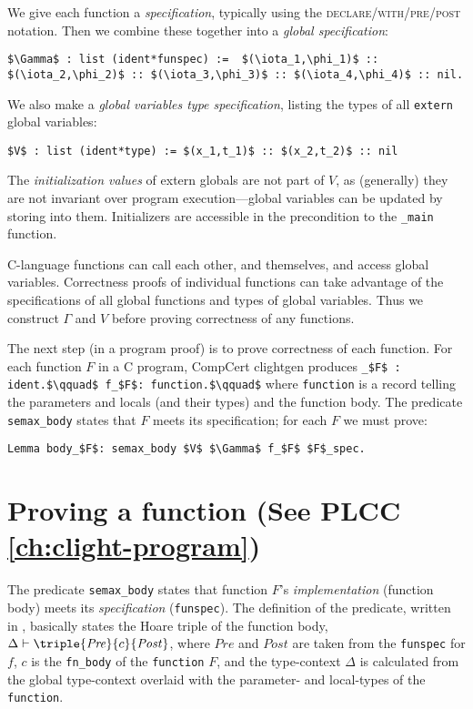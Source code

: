 \documentclass[12pt,fleqn,openany,oneside,showtrims]{memoir}
\newcommand{\ychapter}[2]{\chapter[#1]{#1 \hfill \normalsize #2}}
\begin{document}
We give each function a \emph{specification},
typically using the \textsc{declare/\linebreak[1]with/\linebreak[1]pre/\linebreak[1]post} notation.
Then we combine these together into a \emph{global specification}:
\begin{lstlisting}
$\Gamma$ : list (ident*funspec) :=  $(\iota_1,\phi_1)$ :: $(\iota_2,\phi_2)$ :: $(\iota_3,\phi_3)$ :: $(\iota_4,\phi_4)$ :: nil.
\end{lstlisting}

We also make a \emph{global variables type specification}, listing the 
types of all \lstinline{extern} global variables:
\begin{lstlisting}
$V$ : list (ident*type) := $(x_1,t_1)$ :: $(x_2,t_2)$ :: nil
\end{lstlisting}
The \emph{initialization values} of extern globals are not part of $V$,
as (generally) they are not invariant over program execution---global
variables can be updated by storing into them.  Initializers are accessible
in the precondition to the \lstinline{_main} function.

C-language functions can call each other, and themselves, and access global variables.  Correctness proofs of individual functions can take advantage of the
specifications of all global functions and types of global variables.
Thus we construct $\Gamma$ and $V$ before proving correctness of any
functions.

The next  step (in a program proof) is to prove correctness of each function.
For each function $F$  in a C program, CompCert clightgen produces\linebreak
\lstinline{_$F$ : ident.$\qquad$ f_$F$: function.$\qquad$}
where \lstinline{function} is a record telling the parameters and locals (and their types) and the function body.  The predicate \lstinline{semax_body} states that $F$ meets its specification; for each $F$ we must prove:
\begin{lstlisting}
Lemma body_$F$: semax_body $V$ $\Gamma$ f_$F$ $F$_spec.
\end{lstlisting}

\ychapter{Proving a function}{(See PLCC \autoref{ch:clight-program})}

The predicate \lstinline{semax_body} states that
function $F$'s \emph{implementation} (function body)
meets its \emph{specification} (\lstinline{funspec}).
The definition of the predicate, written in ,
basically states the Hoare triple of the function body,
$\Delta\vdash \triple{\mathit{Pre}}{c}{\mathit{Post}}$, where
$\mathit{Pre}$ and $\mathit{Post}$ are taken from the \lstinline{funspec}
for $f$, $c$ is the \lstinline{fn_body} of the \lstinline{function} $F$,
and the type-context $\Delta$ is calculated from the global type-context
overlaid with the parameter- and local-types of the  \lstinline{function}.
\end{document}
